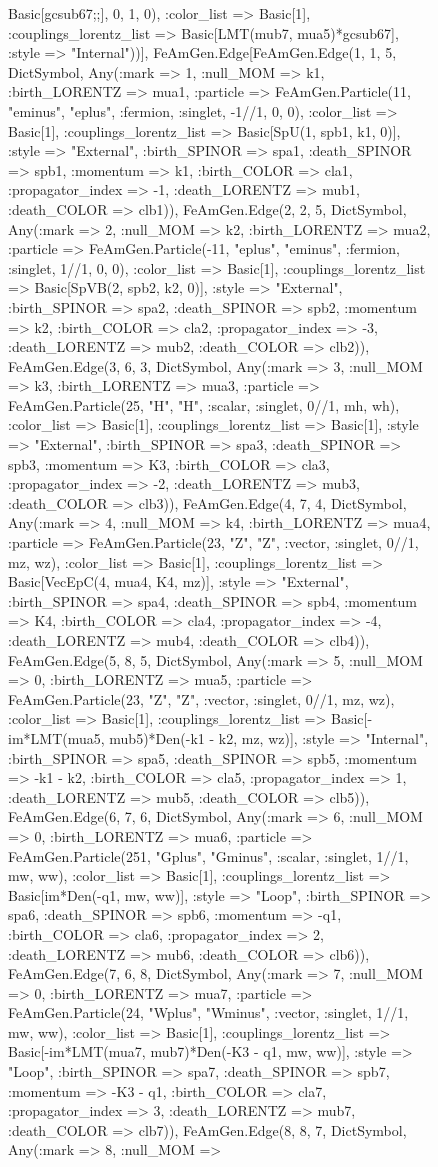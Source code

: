 \documentclass{revtex4}
\begin{document}
\begin{figure}[!htb]
\begin{center}
{Basic[gcsub67;;], 0, 1, 0), :color_list => Basic[1], :couplings_lorentz_list => Basic[LMT(mub7, mua5)*gcsub67], :style => "Internal"))], FeAmGen.Edge[FeAmGen.Edge(1, 1, 5, Dict{Symbol, Any}(:mark => 1, :null_MOM => k1, :birth_LORENTZ => mua1, :particle => FeAmGen.Particle(11, "eminus", "eplus", :fermion, :singlet, -1//1, 0, 0), :color_list => Basic[1], :couplings_lorentz_list => Basic[SpU(1, spb1, k1, 0)], :style => "External", :birth_SPINOR => spa1, :death_SPINOR => spb1, :momentum => k1, :birth_COLOR => cla1, :propagator_index => -1, :death_LORENTZ => mub1, :death_COLOR => clb1)), FeAmGen.Edge(2, 2, 5, Dict{Symbol, Any}(:mark => 2, :null_MOM => k2, :birth_LORENTZ => mua2, :particle => FeAmGen.Particle(-11, "eplus", "eminus", :fermion, :singlet, 1//1, 0, 0), :color_list => Basic[1], :couplings_lorentz_list => Basic[SpVB(2, spb2, k2, 0)], :style => "External", :birth_SPINOR => spa2, :death_SPINOR => spb2, :momentum => k2, :birth_COLOR => cla2, :propagator_index => -3, :death_LORENTZ => mub2, :death_COLOR => clb2)), FeAmGen.Edge(3, 6, 3, Dict{Symbol, Any}(:mark => 3, :null_MOM => k3, :birth_LORENTZ => mua3, :particle => FeAmGen.Particle(25, "H", "H", :scalar, :singlet, 0//1, mh, wh), :color_list => Basic[1], :couplings_lorentz_list => Basic[1], :style => "External", :birth_SPINOR => spa3, :death_SPINOR => spb3, :momentum => K3, :birth_COLOR => cla3, :propagator_index => -2, :death_LORENTZ => mub3, :death_COLOR => clb3)), FeAmGen.Edge(4, 7, 4, Dict{Symbol, Any}(:mark => 4, :null_MOM => k4, :birth_LORENTZ => mua4, :particle => FeAmGen.Particle(23, "Z", "Z", :vector, :singlet, 0//1, mz, wz), :color_list => Basic[1], :couplings_lorentz_list => Basic[VecEpC(4, mua4, K4, mz)], :style => "External", :birth_SPINOR => spa4, :death_SPINOR => spb4, :momentum => K4, :birth_COLOR => cla4, :propagator_index => -4, :death_LORENTZ => mub4, :death_COLOR => clb4)), FeAmGen.Edge(5, 8, 5, Dict{Symbol, Any}(:mark => 5, :null_MOM => 0, :birth_LORENTZ => mua5, :particle => FeAmGen.Particle(23, "Z", "Z", :vector, :singlet, 0//1, mz, wz), :color_list => Basic[1], :couplings_lorentz_list => Basic[-im*LMT(mua5, mub5)*Den(-k1 - k2, mz, wz)], :style => "Internal", :birth_SPINOR => spa5, :death_SPINOR => spb5, :momentum => -k1 - k2, :birth_COLOR => cla5, :propagator_index => 1, :death_LORENTZ => mub5, :death_COLOR => clb5)), FeAmGen.Edge(6, 7, 6, Dict{Symbol, Any}(:mark => 6, :null_MOM => 0, :birth_LORENTZ => mua6, :particle => FeAmGen.Particle(251, "Gplus", "Gminus", :scalar, :singlet, 1//1, mw, ww), :color_list => Basic[1], :couplings_lorentz_list => Basic[im*Den(-q1, mw, ww)], :style => "Loop", :birth_SPINOR => spa6, :death_SPINOR => spb6, :momentum => -q1, :birth_COLOR => cla6, :propagator_index => 2, :death_LORENTZ => mub6, :death_COLOR => clb6)), FeAmGen.Edge(7, 6, 8, Dict{Symbol, Any}(:mark => 7, :null_MOM => 0, :birth_LORENTZ => mua7, :particle => FeAmGen.Particle(24, "Wplus", "Wminus", :vector, :singlet, 1//1, mw, ww), :color_list => Basic[1], :couplings_lorentz_list => Basic[-im*LMT(mua7, mub7)*Den(-K3 - q1, mw, ww)], :style => "Loop", :birth_SPINOR => spa7, :death_SPINOR => spb7, :momentum => -K3 - q1, :birth_COLOR => cla7, :propagator_index => 3, :death_LORENTZ => mub7, :death_COLOR => clb7)), FeAmGen.Edge(8, 8, 7, Dict{Symbol, Any}(:mark => 8, :null_MOM => }
\end{center}
\end{figure}
\end{document}
